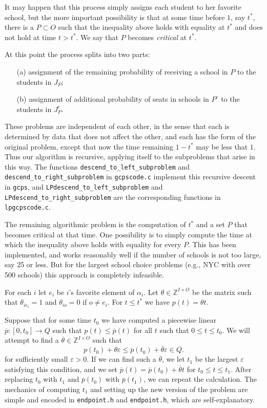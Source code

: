 \documentclass[12pt]{article}
\theoremstyle{definition}
\newcommand{\In}{\mathbb{Z}}
\newcommand{\barp}{\overline{p}}
\newcommand{\bartheta}{{\overline \theta}}
\newcommand{\varep}{\varepsilon}
\begin{document}
\begin{appendix}
It may happen that this process simply assigns each student to her
favorite school, but the more important possibility is that at some
time before $1$, say $t^*$, there is a $P \subset O$ such that the
inequality above holds with equality at $t^*$ and does not hold at
time $t > t^*$.  We say that $P$ becomes \emph{critical} at $t^*$.

At this point the process splits into two parts:
\begin{enumerate}
  \item[(a)] assignment of the remaining probability of receiving a
    school in $P$ to the students in $J_P$;
  \item[(b)] assignment of additional probability of seats in schools
    in $P^c$ to the students in $J_P^c$.
\end{enumerate}
These problems are independent of each other, in the sense that each
is determined by data that does not affect the other, and each has the
form of the original problem, except that now the time remaining $1 -
t^*$ may be less that $1$.  Thus our algorithm is recursive, applying
itself to the subproblems that arise in this way.  The functions
\texttt{descend\_to\_left\_subproblem} and
\texttt{descend\_to\_right\_subproblem} in \texttt{gcpscode.c}
implement this recursive descent in \texttt{gcps}, and
\texttt{LPdescend\_to\_left\_subproblem} and
\texttt{LPdescend\_to\_right\_subproblem}  are the
corresponding functions in \texttt{lpgcpscode.c}.

The remaining algorithmic problem is the computation of $t^*$ and a
set $P$ that becomes critical at that time.  One possibility is to
simply compute the time at which the inequality above holds with
equality for every $P$.  This has been implemented, and works
reasonably well if the number of schools is not too large, say 25 or
less.  But for the largest school choice problems (e.g., NYC with over
500 schools) this approach is completely infeasible.

For each $i$ let $e_i$ be $i$'s favorite
element of $\alpha_i$.  Let $\theta \in \In^{I \times O}$ be the
matrix such that $\theta_{ie_i} = 1$ and $\theta_{io} = 0$ if $o \ne
e_i$.  For $t \le t^*$ we have $p(t) = \theta t$.

Suppose that for some time $t_0$ we have computed a piecewise linear
$\barp \colon [0,t_0] \to Q$ such that $p(t) \le \barp(t)$ for all $t$
such that $0 \le t \le t_0$.  We will attempt to find a $\bartheta \in
\In^{I \times O}$ such that
$$p(t_0) + \theta \varep \le \barp(t_0) + \bartheta \varep \in Q.$$
for sufficiently small $\varep > 0$.  If we can find such a
$\bartheta$, we let $t_1$ be the largest $\varep$ satisfying this
condition, and we set $\barp(t) = \barp(t_0) + \bartheta t$ for $t_0
\le t \le t_1$.  After replacing $t_0$ with $t_1$ and $\barp(t_0)$
with $\barp(t_1)$, we can repeat the calculation.  The mechanics of
computing $t_1$ and setting up the new version of the problem are
simple and encoded in \texttt{endpoint.h} and \texttt{endpoint.h},
which are self-explanatory.


\end{appendix}
\end{document}
